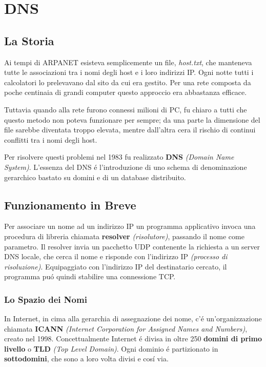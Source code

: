 \documentclass[12pt]{article}
\begin{document}
\clearpage
\section{DNS}\label{dns}

\subsection{La Storia}\label{dns-la-storia}
Ai tempi di ARPANET esisteva semplicemente un file, \textit{host.txt}, che manteneva tutte le associazioni tra i nomi degli host e i 
loro indirizzi IP. Ogni notte tutti i calcolatori lo prelevavano dal sito da cui era gestito. Per una rete composta da poche 
centinaia di grandi computer questo approccio era abbastanza efficace.

Tuttavia quando alla rete furono connessi milioni di PC, fu chiaro a tutti che questo metodo non poteva funzionare per sempre; 
da una parte la dimensione del file sarebbe diventata troppo elevata, mentre dall'altra cera il rischio di continui conflitti 
tra i nomi degli host.

Per risolvere questi problemi nel 1983 fu realizzato \textbf{DNS} \textit{(Domain Name System)}. L'essenza del DNS \'e 
l'introduzione di uno schema di denominazione gerarchico bastato su domini e di un database distribuito.

\subsection{Funzionamento in Breve}\label{dns-funzionamento}
Per associare un nome ad un indirizzo IP un programma applicativo invoca una procedura di libreria chiamata \textbf{resolver} 
\textit{(risolutore)}, passando il nome come parametro. Il resolver invia un pacchetto UDP contenente la richiesta a un server 
DNS locale, che cerca il nome e risponde con l'indirizzo IP \textit{(processo di risoluzione)}. Equipaggiato con l'indirizzo IP del 
destinatario cercato, il programma pu\'o quindi stabilire una connessione TCP.

\subsubsection{Lo Spazio dei Nomi}\label{dns-lo-spazio-dei-nomi}
In Internet, in cima alla gerarchia di assegnazione dei nome, c'\'e un'organizzazione chiamata \textbf{ICANN} \textit{(Internet 
Corporation for Assigned Names and Numbers)}, creato nel 1998. Concettualmente Internet \'e divisa in oltre 250 \textbf{domini 
di primo livello} o \textbf{TLD} \textit{(Top Level Domain)}. Ogni dominio \'e partizionato in \textbf{sottodomini}, che sono a loro 
volta divisi e cos\'i via.
\end{document}
